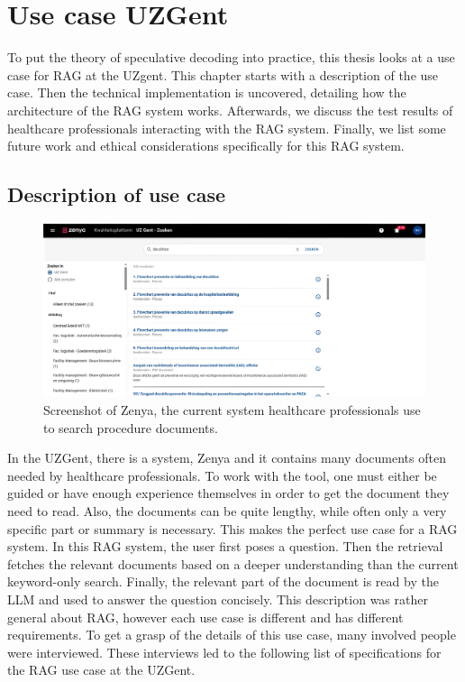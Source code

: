 
\chapter{Use case UZGent}
\label{sec:use_case_uzgent}
To put the theory of speculative decoding into practice, this thesis looks at a use case for RAG at the UZgent. This chapter starts with a description of the use case. Then the technical implementation is uncovered, detailing how the architecture of the RAG system works. Afterwards, we discuss the test results of healthcare professionals interacting with the RAG system. Finally, we list some future work and ethical considerations specifically for this RAG system.

\section{Description of use case}

\begin{figure}[h]
	\centering
	\includegraphics[width=\linewidth]{fig/zenya.png}
	\caption{Screenshot of Zenya, the current system healthcare professionals use to search procedure documents.}
	\label{fig:zenya}
\end{figure}

In the UZGent, there is a system, Zenya and it contains many documents often needed by healthcare professionals. To work with the tool, one must either be guided or have enough experience themselves in order to get the document they need to read. Also, the documents can be quite lengthy, while often only a very specific part or summary is necessary. This makes the perfect use case for a RAG system. In this RAG system, the user first poses a question. Then the retrieval fetches the relevant documents based on a deeper understanding than the current keyword-only search. Finally, the relevant part of the document is read by the LLM and used to answer the question concisely. This description was rather general about RAG, however each use case is different and has different requirements. To get a grasp of the details of this use case, many involved people were interviewed. These interviews led to the following list of specifications for the RAG use case at the UZGent.

